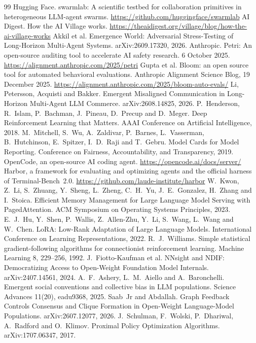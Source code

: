 \documentclass[11pt,a4paper]{article}
\begin{document}
\begin{thebibliography}{99}
 Hugging Face. swarmlab: A scientific testbed for collaboration primitives in
  heterogeneous LLM-agent swarms. \url{https://github.com/huggingface/swarmlab}
 AI Digest. How the AI Village works.
  \url{https://theaidigest.org/village/blog/how-the-ai-village-works}
 Akkil et al. Emergence World: Adversarial Stress-Testing of Long-Horizon Multi-Agent
  Systems. arXiv:2609.17320, 2026.
 Anthropic. Petri: An open-source auditing tool to accelerate AI safety research.
  6 October 2025. \url{https://alignment.anthropic.com/2025/petri}
 Gupta et al. Bloom: an open source tool for automated behavioral evaluations. Anthropic
  Alignment Science Blog, 19 December 2025. \url{https://alignment.anthropic.com/2025/bloom-auto-evals/}
 Li, Petersson, Acquisti and Bakker. Emergent Misaligned Communication in Long-Horizon
  Multi-Agent LLM Commerce. arXiv:2608.14825, 2026.
 P.~Henderson, R.~Islam, P.~Bachman, J.~Pineau, D.~Precup and D.~Meger. Deep
  Reinforcement Learning that Matters. AAAI Conference on Artificial Intelligence, 2018.
 M.~Mitchell, S.~Wu, A.~Zaldivar, P.~Barnes, L.~Vasserman, B.~Hutchinson, E.~Spitzer,
  I.~D.~Raji and T.~Gebru. Model Cards for Model Reporting. Conference on Fairness, Accountability, and
  Transparency, 2019.
 OpenCode, an open-source AI coding agent. \url{https://opencode.ai/docs/server/}
 Harbor, a framework for evaluating and optimizing agents and the official harness of
  Terminal-Bench~2.0. \url{https://github.com/laude-institute/harbor}
 W.~Kwon, Z.~Li, S.~Zhuang, Y.~Sheng, L.~Zheng, C.~H.~Yu, J.~E.~Gonzalez, H.~Zhang and
  I.~Stoica. Efficient Memory Management for Large Language Model Serving with PagedAttention. ACM
  Symposium on Operating Systems Principles, 2023.
 E.~J.~Hu, Y.~Shen, P.~Wallis, Z.~Allen-Zhu, Y.~Li, S.~Wang, L.~Wang and W.~Chen. LoRA:
  Low-Rank Adaptation of Large Language Models. International Conference on Learning Representations, 2022.
 R.~J.~Williams. Simple statistical gradient-following algorithms for connectionist
  reinforcement learning. Machine Learning 8, 229--256, 1992.
 J.~Fiotto-Kaufman et al. NNsight and NDIF: Democratizing Access to Open-Weight
  Foundation Model Internals. arXiv:2407.14561, 2024.
 A.~F.~Ashery, L.~M.~Aiello and A.~Baronchelli. Emergent social conventions and
  collective bias in LLM populations. Science Advances 11(20), eadu9368, 2025.
 Saab~Jr and Abdallah. Graph Feedback Controls Consensus and Clique Formation in
  Open-Weight Language-Model Populations. arXiv:2607.12077, 2026.
 J.~Schulman, F.~Wolski, P.~Dhariwal, A.~Radford and O.~Klimov. Proximal Policy
  Optimization Algorithms. arXiv:1707.06347, 2017.
\end{thebibliography}
\end{document}
